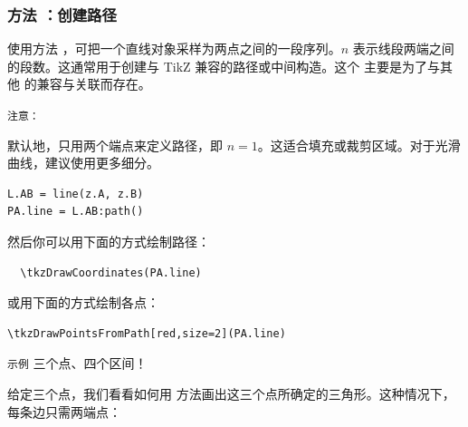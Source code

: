 \subsubsection{方法 ：创建路径}
\label{ssub:line_path}

使用方法 ，可把一个直线对象采样为两点之间的一段序列。$n$ 表示线段两端之间的段数。这通常用于创建与 TikZ 兼容的路径或中间构造。这个 
主要是为了与其他  的兼容与关联而存在。
\medskip

\texttt{注意： }

默认地，只用两个端点来定义路径，即 $n = 1$。这适合填充或裁剪区域。对于光滑曲线，建议使用更多细分。

\medskip

\begin{mybox}
\begin{verbatim}
L.AB = line(z.A, z.B)
PA.line = L.AB:path()
\end{verbatim}
\end{mybox}

然后你可以用下面的方式绘制路径：

\begin{mybox}
\begin{verbatim}
  \tkzDrawCoordinates(PA.line)
\end{verbatim}
\end{mybox}

或用下面的方式绘制各点：

\begin{mybox}
\begin{verbatim}
\tkzDrawPointsFromPath[red,size=2](PA.line)
\end{verbatim}
\end{mybox}

\texttt{示例}
三个点、四个区间！

\begin{tkzexample}[latex = .5\textwidth]
\end{tkzexample}

给定三个点，我们看看如何用  方法画出这三个点所确定的三角形。这种情况下，每条边只需两端点：

\begin{tkzexample}[latex = .5\textwidth]
\end{tkzexample}

